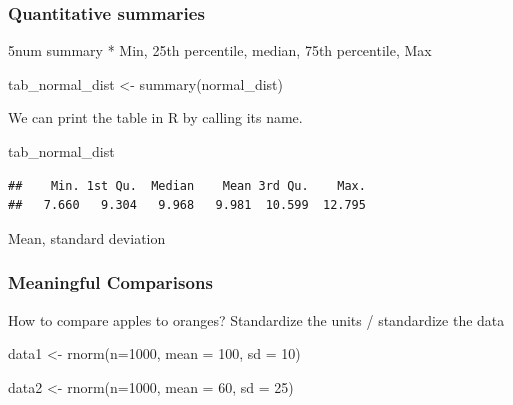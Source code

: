 \documentclass[
]{book}
\newenvironment{Shaded}{\begin{snugshade}}{\end{snugshade}}
\newcommand{\AttributeTok}[1]{\textcolor[rgb]{0.77,0.63,0.00}{#1}}
\newcommand{\DecValTok}[1]{\textcolor[rgb]{0.00,0.00,0.81}{#1}}
\newcommand{\FunctionTok}[1]{\textcolor[rgb]{0.00,0.00,0.00}{#1}}
\newcommand{\NormalTok}[1]{#1}
\newcommand{\OtherTok}[1]{\textcolor[rgb]{0.56,0.35,0.01}{#1}}
\begin{document}
\hypertarget{quantitative-summaries}{%
\subsubsection{Quantitative summaries}\label{quantitative-summaries}}

5num summary
* Min, 25th percentile, median, 75th percentile, Max

\begin{Shaded}
\begin{Highlighting}[]
\NormalTok{tab\_normal\_dist }\OtherTok{\textless{}{-}} \FunctionTok{summary}\NormalTok{(normal\_dist)}
\end{Highlighting}
\end{Shaded}

We can print the table in R by calling its name.

\begin{Shaded}
\begin{Highlighting}[]
\NormalTok{tab\_normal\_dist}
\end{Highlighting}
\end{Shaded}

\begin{verbatim}
##    Min. 1st Qu.  Median    Mean 3rd Qu.    Max. 
##   7.660   9.304   9.968   9.981  10.599  12.795
\end{verbatim}

Mean, standard deviation

\hypertarget{meaningful-comparisons}{%
\subsubsection{Meaningful Comparisons}\label{meaningful-comparisons}}

How to compare apples to oranges? Standardize the units / standardize the data

\begin{Shaded}
\begin{Highlighting}[]
\NormalTok{data1 }\OtherTok{\textless{}{-}} \FunctionTok{rnorm}\NormalTok{(}\AttributeTok{n=}\DecValTok{1000}\NormalTok{, }
              \AttributeTok{mean =} \DecValTok{100}\NormalTok{,}
              \AttributeTok{sd =} \DecValTok{10}\NormalTok{)}

\NormalTok{data2 }\OtherTok{\textless{}{-}} \FunctionTok{rnorm}\NormalTok{(}\AttributeTok{n=}\DecValTok{1000}\NormalTok{,}
               \AttributeTok{mean =} \DecValTok{60}\NormalTok{, }
               \AttributeTok{sd =} \DecValTok{25}\NormalTok{)}
\end{Highlighting}
\end{Shaded}
\end{document}
